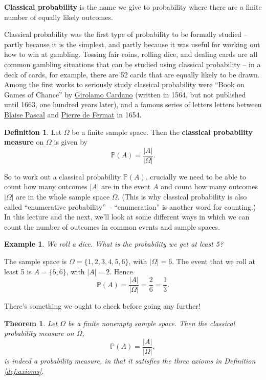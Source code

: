 \documentclass[
  a4paper,
]{book}
\newtheorem{theorem}{Theorem}[chapter]
\theoremstyle{definition}
\newtheorem{definition}{Definition}[chapter]
\theoremstyle{definition}
\newtheorem{example}{Example}[chapter]
\theoremstyle{definition}
\theoremstyle{definition}
\theoremstyle{remark}
\begin{document}
\textbf{Classical probability} is the name we give to probability where there are a finite number of equally likely outcomes.

Classical probability was the first type of probability to be formally studied -- partly because it is the simplest, and partly because it was useful for working out how to win at gambling. Tossing fair coins, rolling dice, and dealing cards are all common gambling situations that can be studied using classical probability -- in a deck of cards, for example, there are 52 cards that are equally likely to be drawn. Among the first works to seriously study classical probability were ``Book on Games of Chance'' by \href{https://mathshistory.st-andrews.ac.uk/Biographies/Cardan/}{Girolamo Cardano} (written in 1564, but not published until 1663, one hundred years later), and a famous series of letters letters between \href{https://mathshistory.st-andrews.ac.uk/Biographies/Pascal/}{Blaise Pascal} and \href{https://mathshistory.st-andrews.ac.uk/Biographies/Fermat/}{Pierre de Fermat} in 1654.

\begin{definition}
Let \(\Omega\) be a finite sample space. Then the \textbf{classical probability measure} on \(\Omega\) is given by
\[ \mathbb P(A) = \frac{|A|}{|\Omega|} . \]
\end{definition}

So to work out a classical probability \(\mathbb P(A)\), crucially we need to be able to count how many outcomes \(|A|\) are in the event \(A\) and count how many outcomes \(|\Omega|\) are in the whole sample space \(\Omega\). (This is why classical probability is also called ``enumerative probability'' -- ``enumeration'' is another word for counting.) In this lecture and the next, we'll look at some different ways in which we can count the number of outcomes in common events and sample spaces.

\begin{example}
\emph{We roll a dice. What is the probability we get at least 5?}

The sample space is \(\Omega = \{1,2,3,4,5,6\}\), with \(|\Omega| = 6\). The event that we roll at least 5 is \(A = \{5,6\}\), with \(|A| = 2\). Hence
\[ \mathbb P(A) = \frac{|A|}{|\Omega|} = \frac{2}{6} = \frac{1}{3} . \]
\end{example}

There's something we ought to check before going any further!

\begin{theorem}
Let \(\Omega\) be a finite nonempty sample space. Then the classical probability measure on \(\Omega\),
\[ \mathbb P(A) = \frac{|A|}{|\Omega|} , \]
is indeed a probability measure, in that it satisfies the three axioms in Definition \ref{def:axioms}.
\end{theorem}
\end{document}
